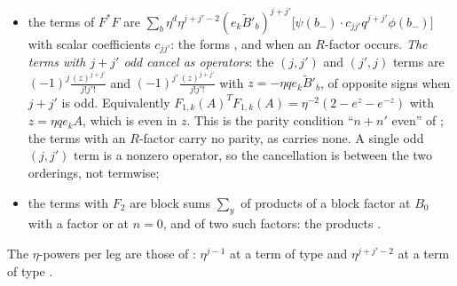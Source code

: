 \begin{lemma}
\begin{enumerate}[label=\textup{(\alph*)},nosep,leftmargin=*]
\begin{itemize}[nosep,leftmargin=*]
\item the terms of $F^*F$ are $\sum_b\eta^d\eta^{j+j'-2}(e_k\tilde B'_b)^{j+j'}\big[\psi(b_-)\cdot c_{jj'}q^{j+j'}\phi(b_-)\big]$ with scalar coefficients $c_{jj'}$: the forms \cite[(1.10)]{Ba3}, and \cite[(1.11)]{Ba3} when an $R$-factor occurs. \emph{The terms with $j+j'$ odd cancel as operators}: the $(j,j')$ and $(j',j)$ terms are $(-1)^j\frac{(z)^{j+j'}}{j!j'!}$ and $(-1)^{j'}\frac{(z)^{j+j'}}{j!j'!}$ with $z=-\eta qe_k\tilde B'_b$, of opposite signs when $j+j'$ is odd. Equivalently $F_{1,k}(A)^TF_{1,k}(A)=\eta^{-2}(2-e^z-e^{-z})$ with $z=\eta qe_kA$, which is even in $z$. This is the parity condition ``$n+n'$ even'' of \cite[(1.10)]{Ba3}; the terms with an $R$-factor carry no parity, as \cite[(1.11)]{Ba3} carries none. A single odd $(j,j')$ term is a nonzero operator, so the cancellation is between the two orderings, not termwise;
\item the terms with $F_2$ are block sums $\sum_y$ of products of a block factor \cite[(1.13)]{Ba3} at $B_0$ with a factor \cite[(1.14)]{Ba3} or \cite[(1.15)]{Ba3} at $n=0$, and of two such factors: the products \cite[(1.18)]{Ba3}.
\end{itemize}
The $\eta$-powers per leg are those of \cite[(1.8)--(1.15)]{Ba3}: $\eta^{j-1}$ at a term of type \cite[(1.8)]{Ba3} and $\eta^{j+j'-2}$ at a term of type \cite[(1.10)]{Ba3}.
\end{enumerate}
\end{lemma}

